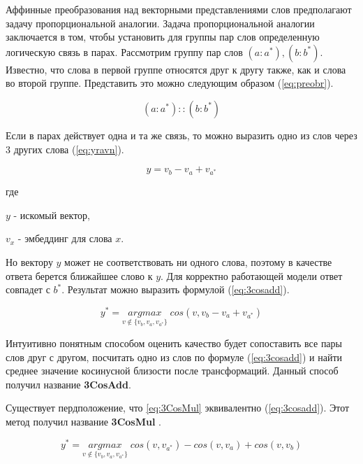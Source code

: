 \documentclass[a4paper,14pt]{article}
\begin{document}
	Аффинные преобразования над векторными представлениями слов предполагают задачу пропорциональной аналогии.
	Задача пропорциональной аналогии заключается в том, чтобы установить для группы пар слов определенную логическую связь в парах.
	Рассмотрим группу пар слов $(a: a^*), (b: b^*)$. 
	Известно, что слова в первой группе относятся друг к другу также, как и слова во второй группе.
	Представить это можно следующим образом (\ref{eq:preobr}).
	
	\begin{equation}
		(a: a^*) :: (b: b^*)
		\label{eq:preobr}
	\end{equation}

	Если в парах действует одна и та же связь, то можно выразить одно из слов через 3 других слова (\ref{eq:yravn}).
	
	\begin{equation}
		y = v_b - v_a + v_{a^*}
		\label{eq:yravn}
	\end{equation}
	 
	 где 
	 
	 $y$ - искомый вектор,
	 
	 $v_x$ - эмбеддинг для слова $x$.
	 
	 Но вектору $y$ может не соответствовать ни одного слова, поэтому в качестве ответа берется ближайшее слово к $y$.
	 Для корректно работающей модели ответ совпадет с $b^*$.
	 Результат можно выразить формулой (\ref{eq:3cosadd}).
	 
	 \begin{equation}
	 	y^* = \underset{v \notin \{v_b, v_a, v_{a^*}\}}{argmax} \; cos(v, v_b - v_a + v_{a^*})
	 	\label{eq:3cosadd}
	 \end{equation}
	 
	 
	Интуитивно понятным способом оценить качество будет сопоставить все пары слов друг с другом, посчитать одно из слов по формуле (\ref{eq:3cosadd}) \cite{21} и найти среднее значение косинусной близости после трансформаций.
	Данный способ получил название \textbf{3CosAdd}.
	
	Существует пердположение, что \ref{eq:3CosMul} эквивалентно (\ref{eq:3cosadd}). Этот метод получил название \textbf{3CosMul} \cite{21}.
	
	\begin{equation}
		y^* = \underset{v \notin \{v_b, v_a, v_{a^*}\}}{argmax} \; cos(v, v_{a^*}) - cos(v, v_a) + cos(v, v_b)
		\label{eq:3CosMul}
	\end{equation}
\end{document}
